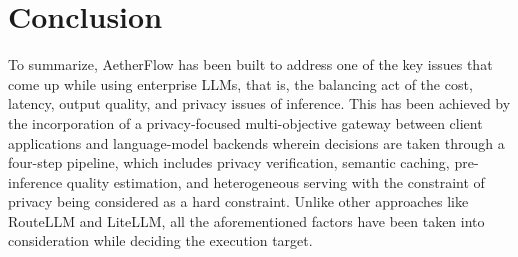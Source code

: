 \section{Conclusion}
\label{sec:ch1-conclusion}

To summarize, AetherFlow has been built to address one of the key issues that come up while using enterprise LLMs, that is, the balancing act of the cost, latency, output quality, and privacy issues of inference. This has been achieved by the incorporation of a privacy-focused multi-objective gateway between client applications and language-model backends wherein decisions are taken through a four-step pipeline, which includes privacy verification, semantic caching, pre-inference quality estimation, and heterogeneous serving with the constraint of privacy being considered as a hard constraint. Unlike other approaches like RouteLLM and LiteLLM, all the aforementioned factors have been taken into consideration while deciding the execution target.
